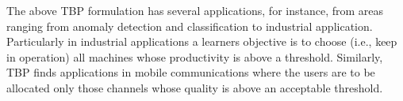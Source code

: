 The above TBP formulation has several 
applications, for instance, from areas ranging from anomaly detection and classification \cite{locatelli2016optimal} to industrial application. Particularly in industrial applications a learners objective is to choose (i.e., keep in  operation) all machines whose productivity is above a threshold. Similarly, TBP finds applications in mobile communications \cite{audibert2010best}  where the users are to be allocated only those channels whose quality is above an acceptable threshold.

%
%
%
%
%